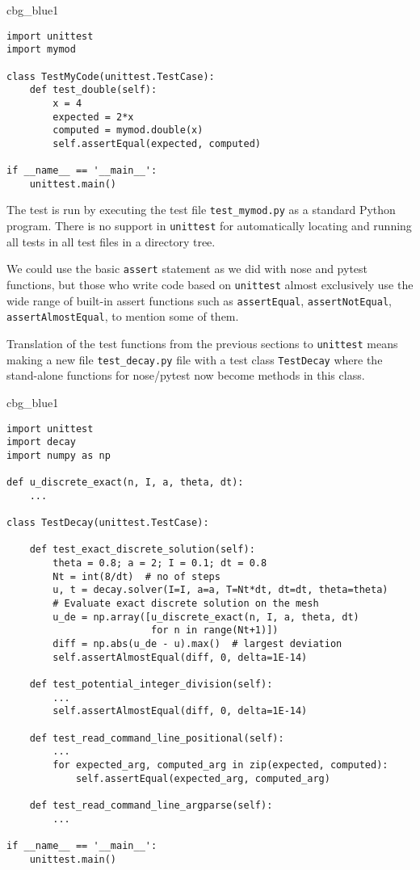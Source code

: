 \documentclass[graybox,sectrefs,envcountresetchap,open=right,final]{svmonodo}
\newenvironment{_cod_tight}[1]{
   \def\FrameCommand{\colorbox{#1}}
   \FrameRule0.6pt\MakeFramed {\FrameRestore}\vskip3mm}
   {\vskip0mm\endMakeFramed}
\newenvironment{cod}[1]{
\bgroup\rmfamily
\fboxsep=0mm\relax
\begin{_cod_tight}{#1}
\list{}{\parsep=-2mm\parskip=0mm\topsep=0pt\leftmargin=2mm
\rightmargin=2\leftmargin\leftmargin=4pt\relax}
\item\relax}
{\endlist\end{_cod_tight}\egroup}
\begin{document}
\begin{cod}{cbg_blue1}\begin{Verbatim}[numbers=none,fontsize=\fontsize{9pt}{9pt},baselinestretch=0.95,xleftmargin=2mm]
import unittest
import mymod

class TestMyCode(unittest.TestCase):
    def test_double(self):
        x = 4
        expected = 2*x
        computed = mymod.double(x)
        self.assertEqual(expected, computed)

if __name__ == '__main__':
    unittest.main()
\end{Verbatim}
\end{cod}
\noindent
The test is run by executing the test file \Verb!test_mymod.py! as a standard
Python program. There is no support in \texttt{unittest} for automatically
locating and running all tests in all test files in a directory tree.

We could use the basic \texttt{assert} statement as we did with nose and pytest
functions, but those who write code based on \texttt{unittest} almost
exclusively use the wide range of built-in assert functions such
as \texttt{assertEqual}, \texttt{assertNotEqual}, \texttt{assertAlmostEqual}, to mention
some of them.

Translation of the test functions from the previous sections
to \texttt{unittest} means making a new file \Verb!test_decay.py! file with a
test class \texttt{TestDecay} where the stand-alone functions for
nose/pytest now become methods in this class.

\begin{cod}{cbg_blue1}\begin{Verbatim}[numbers=none,fontsize=\fontsize{9pt}{9pt},baselinestretch=0.95,xleftmargin=2mm]
import unittest
import decay
import numpy as np

def u_discrete_exact(n, I, a, theta, dt):
    ...

class TestDecay(unittest.TestCase):

    def test_exact_discrete_solution(self):
        theta = 0.8; a = 2; I = 0.1; dt = 0.8
        Nt = int(8/dt)  # no of steps
        u, t = decay.solver(I=I, a=a, T=Nt*dt, dt=dt, theta=theta)
        # Evaluate exact discrete solution on the mesh
        u_de = np.array([u_discrete_exact(n, I, a, theta, dt)
                         for n in range(Nt+1)])
        diff = np.abs(u_de - u).max()  # largest deviation
        self.assertAlmostEqual(diff, 0, delta=1E-14)

    def test_potential_integer_division(self):
        ...
        self.assertAlmostEqual(diff, 0, delta=1E-14)

    def test_read_command_line_positional(self):
        ...
        for expected_arg, computed_arg in zip(expected, computed):
            self.assertEqual(expected_arg, computed_arg)

    def test_read_command_line_argparse(self):
        ...

if __name__ == '__main__':
    unittest.main()
\end{Verbatim}
\end{cod}
\noindent
\end{document}
